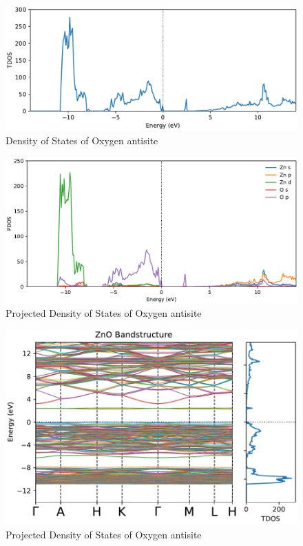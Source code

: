 \begin{figure}[tbh!]
	\centering
	\includegraphics[width=0.7\linewidth]{"images/dos_O-antisite"}
	\caption[Density of states of Oxygen antisite]{Density of States of Oxygen antisite}
\end{figure}

\begin{figure}[tbh!]
	\centering
	\includegraphics[width=0.7\linewidth]{"images/pdos_O-antisite"}
	\caption[Projected Density of states of Oxygen antisite]{Projected Density of States of Oxygen antisite}
\end{figure}

\begin{figure}[tbh!]
	\centering
	\includegraphics[width=0.7\linewidth]{"images/band-dos_O-antisite"}
	\caption[Combined Density of states of Oxygen antisite]{Projected Density of States of Oxygen antisite}
\end{figure}


